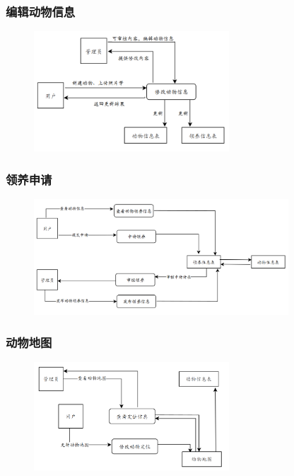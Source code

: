 \documentclass[12pt,a4paper,UTF8]{article}
\begin{document}
\subsubsection{编辑动物信息}

\begin{figure}[H]
  \centering
  \includegraphics[width=0.65\textwidth]{figures/df33.png}
\end{figure}

\subsubsection{领养申请}

\begin{figure}[H]
  \centering
  \includegraphics[width=0.85\textwidth]{figures/df34.png}
\end{figure}

\subsubsection{动物地图}

\begin{figure}[H]
  \centering
  \includegraphics[width=0.65\textwidth]{figures/df35.png}
\end{figure}
\end{document}
